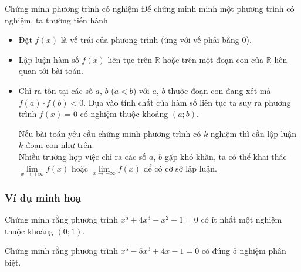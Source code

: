
\begin{dang}{Chứng minh phương trình có nghiệm}
		Để chứng minh minh một phương trình có nghiệm, ta thường tiến hành
	\begin{itemize}
		\item Đặt $f(x)$ là vế trái của phương trình (ứng với vế phải bằng $0$).
		\item Lập luận hàm số $f(x)$ liên tục trên $\mathbb{R}$ hoặc trên một đoạn con của $\mathbb{R}$ liên quan tới bài toán.
		\item Chỉ ra tồn tại các số $a$, $b$ ($a<b$) với $a$, $b$ thuộc đoạn con đang xét mà $f(a)\cdot f(b)<0$. Dựa vào tính chất của hàm số liên tục ta suy ra phương trình $f(x)=0$ có nghiệm thuộc khoảng $(a;b)$.		
		\begin{note}
			Nếu bài toán yêu cầu chứng minh phương trình có $k$ nghiệm thì cần lập luận $k$ đoạn con như trên.\\
			Nhiều trường hợp việc chỉ ra các số $a$, $b$ gặp khó khăn, ta có thể khai thác $\lim \limits _{x\to +\infty}f(x)$ hoặc $\lim \limits _{x\to -\infty}f(x)$ để có cơ sở lập luận. 
		\end{note}
	\end{itemize}
\end{dang}
\subsubsection{Ví dụ minh hoạ}
\begin{vd}%
Chứng minh rằng phương trình $x^5+4x^3-x^2-1=0$ có ít nhất một nghiệm thuộc khoảng $(0;1)$.
\end{vd}
\begin{vd}%
Chứng minh rằng phương trình $x^5-5x^3+4x-1=0$ có đúng $5$ nghiệm phân biệt.
\end{vd}

